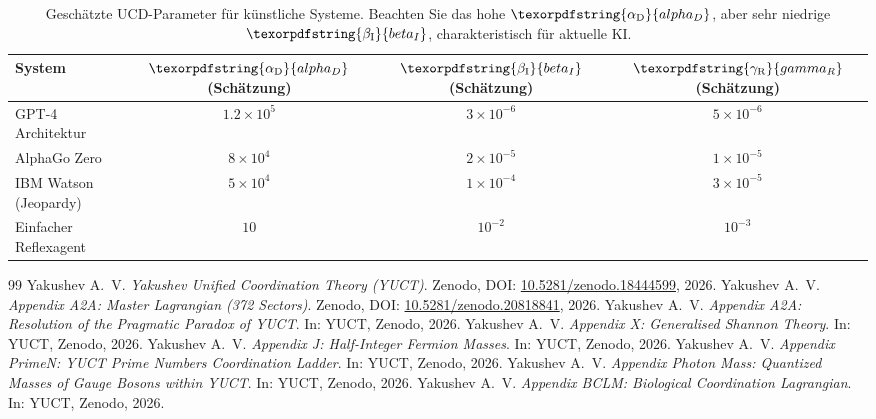 \documentclass[12pt,a4paper]{article}
\DeclareRobustCommand{\alD}{\texorpdfstring{\ensuremath{\alpha_{\mathrm{D}}}}{alpha_D}}
\DeclareRobustCommand{\beI}{\texorpdfstring{\ensuremath{\beta_{\mathrm{I}}}}{beta_I}}
\DeclareRobustCommand{\gaR}{\texorpdfstring{\ensuremath{\gamma_{\mathrm{R}}}}{gamma_R}}
\begin{document}
	\begin{table}[ht]
		\centering
		\begin{tabular}{lccc}
			\toprule
			\textbf{System} & \(\alD\) (Schätzung) & \(\beI\) (Schätzung) & \(\gaR\) (Schätzung) \\
			\midrule
			GPT-4 Architektur & \(1.2 \times 10^5\) & \(3 \times 10^{-6}\) & \(5 \times 10^{-6}\) \\
			AlphaGo Zero & \(8 \times 10^4\) & \(2 \times 10^{-5}\) & \(1 \times 10^{-5}\) \\
			IBM Watson (Jeopardy) & \(5 \times 10^4\) & \(1 \times 10^{-4}\) & \(3 \times 10^{-5}\) \\
			Einfacher Reflexagent & \(10\) & \(10^{-2}\) & \(10^{-3}\) \\
			\bottomrule
		\end{tabular}
		\caption{Geschätzte UCD-Parameter für künstliche Systeme. Beachten Sie das hohe \(\alD\), aber sehr niedrige \(\beI\), charakteristisch für aktuelle KI.}
		\label{tab:ai-measurements}
	\end{table}
	
	\begin{thebibliography}{99}
		Yakushev A.~V. \emph{Yakushev Unified Coordination Theory (YUCT)}. Zenodo, DOI: \href{https://doi.org/10.5281/zenodo.18444599}{10.5281/zenodo.18444599}, 2026.
		Yakushev A.~V. \emph{Appendix A2A: Master Lagrangian (372 Sectors)}. Zenodo, DOI: \href{https://doi.org/10.5281/zenodo.20818841}{10.5281/zenodo.20818841}, 2026.
		Yakushev A.~V. \emph{Appendix A2A: Resolution of the Pragmatic Paradox of YUCT}. In: YUCT, Zenodo, 2026.
		Yakushev A.~V. \emph{Appendix X: Generalised Shannon Theory}. In: YUCT, Zenodo, 2026.
		Yakushev A.~V. \emph{Appendix J: Half-Integer Fermion Masses}. In: YUCT, Zenodo, 2026.
		Yakushev A.~V. \emph{Appendix PrimeN: YUCT Prime Numbers Coordination Ladder}. In: YUCT, Zenodo, 2026.
		Yakushev A.~V. \emph{Appendix Photon Mass: Quantized Masses of Gauge Bosons within YUCT}. In: YUCT, Zenodo, 2026.
		Yakushev A.~V. \emph{Appendix BCLM: Biological Coordination Lagrangian}. In: YUCT, Zenodo, 2026.
	\end{thebibliography}
	
\end{document}
